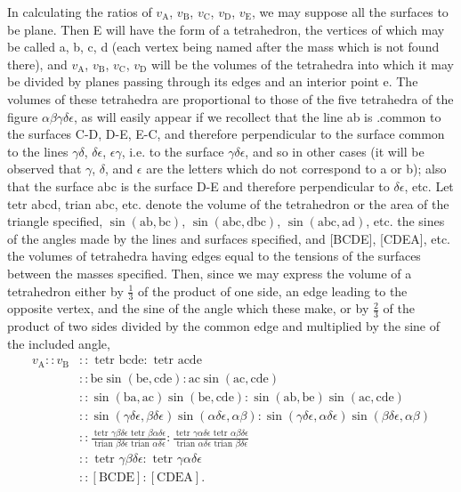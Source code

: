 \documentclass[12pt]{memoir}
\newcommand{\dd}{\delta}
\begin{document}
In calculating the ratios of $v_\text{A}$, $v_\text{B}$, $v_\text{C}$, $v_\text{D}$, $v_\text{E}$, we may suppose all the surfaces to be plane. Then E will have the form of a tetrahedron, the vertices of which may be called a, b, c, d (each vertex being named after the mass which is not found there), and $v_\text{A}$, $v_\text{B}$, $v_\text{C}$, $v_\text{D}$ will be the volumes of the tetrahedra into which it may be divided by planes passing through its edges and an interior point e. The volumes of these tetrahedra are proportional to those of the five tetrahedra of the figure $\alpha\beta\gamma\dd\epsilon$, as will easily appear if we recollect that the line ab is .common to the surfaces C-D, D-E, E-C, and therefore perpendicular to the surface common to the lines $\gamma\dd$, $\dd\epsilon$, $\epsilon\gamma$, i.e. to the surface $\gamma\dd\epsilon$, and so in other cases (it will be observed that $\gamma$, $\dd$, and $\epsilon$ are the letters which do not correspond to a or b); also that the surface abc is the surface D-E and therefore perpendicular to $\dd\epsilon$, etc. Let tetr abcd, trian abc, etc. denote the volume of the tetrahedron or the area of the triangle specified, $\sin (\text{ab}, \text{bc})$, $\sin (\text{abc}, \text{dbc})$, $\sin (\text{abc}, \text{ad})$, etc. the sines of the angles made by the lines and surfaces specified, and [BCDE], [CDEA], etc. the volumes of tetrahedra having edges equal to the tensions of the surfaces between the masses specified. Then, since we may express the volume of a tetrahedron either by $\tfrac{1}{3}$ of the product of one side, an edge leading to the opposite vertex, and the sine of the angle which these make, or by $\tfrac{2}{3}$ of the product of two sides divided by the common edge and multiplied by the sine of the included angle,
\begin{equation*} \begin{array}{cl}
v_\text{A} : :v_\text{B}  &:: \text{ tetr } \text{bcde}: \text{ tetr } \text{acde} \\
 &:: \text{be} \sin (\text{be}, \text{cde}): \text{ac} \sin (\text{ac}, \text{cde}) \\
 &:: \sin (\text{ba}, \text{ac}) \sin (\text{be}, \text{cde}): \sin (\text{ab}, \text{be}) \sin (\text{ac}, \text{cde}) \\
 &:: \sin (\gamma\dd\epsilon, \beta\dd\epsilon) \sin (\alpha\dd\epsilon, \alpha\beta) : \sin (\gamma\dd\epsilon, \alpha \dd \epsilon) \sin (\beta\dd\epsilon, \alpha\beta) \\
 &:: \frac{\text{ tetr } \gamma\beta\dd\epsilon \text{ tetr } \beta \alpha \dd \epsilon}{\text{ trian } \beta\dd\epsilon \text{ trian } \alpha\dd\epsilon} :
\frac{\text{ tetr } \gamma \alpha\dd\epsilon \text{ tetr } \alpha\beta \dd \epsilon }{ \text{ trian } \alpha\dd\epsilon \text{ trian } \beta\dd\epsilon } \\
 &:: \text{ tetr } \gamma\beta\dd \epsilon: \text{ tetr } \gamma\alpha\dd \epsilon \\
 &:: [\text{BCDE}]: [\text{CDEA}].\end{array}\end{equation*}
\end{document}
